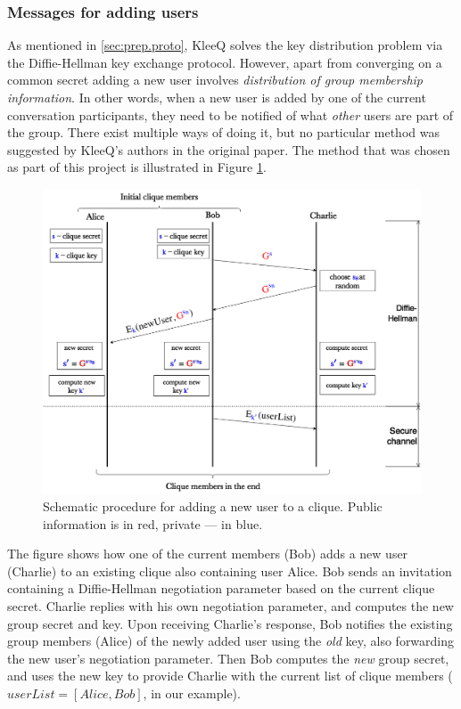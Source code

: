 \documentclass[a4paper, 12pt]{report}
\begin{document}
\subsubsection{Messages for adding users}
As mentioned in \cref{sec:prep.proto}, KleeQ solves the key distribution problem via the Diffie-Hellman key exchange protocol. However, apart from converging on a common secret adding a new user involves \emph{distribution of group membership information}. In other words, when a new user is added by one of the current conversation participants, they need to be notified of what \emph{other} users are part of the group. There exist multiple ways of doing it, but no particular method was suggested by KleeQ's authors in the original paper. The method that was chosen as part of this project is illustrated in Figure \ref{fig:CliqueFormation}.
\begin{figure}[H]
    \captionsetup{width=0.76\textwidth}
    \centering
    \includegraphics[width=0.76\linewidth]{pics/CliqueFormation.png}
    \caption{\label{fig:CliqueFormation} Schematic procedure for adding a new user to a clique. Public information is in {\color{red} red}, private --- in {\color{blue} blue}.}
\end{figure}
The figure shows how one of the current members (Bob) adds a new user (Charlie) to an existing clique also containing user Alice. Bob sends an invitation containing a Diffie-Hellman negotiation parameter based on the current clique secret. Charlie replies with his own negotiation parameter, and computes the new group secret and key. Upon receiving Charlie's response, Bob notifies the existing group members (Alice) of the newly added user using the \emph{old} key, also forwarding the new user's negotiation parameter. Then Bob computes the \emph{new} group secret, and uses the new key to provide Charlie with the current list of clique members ($userList = [Alice, Bob]$, in our example). \\
\end{document}
